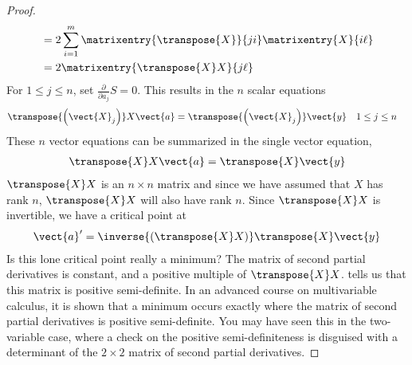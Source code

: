 \begin{proof}
\begin{align*}
%
&=2\sum_{i=1}^m\matrixentry{\transpose{X}}{ji}\matrixentry{X}{i\ell}\\
%
&=2\matrixentry{\transpose{X}X}{j\ell}
%
\end{align*}
%
For $1\leq j\leq n$, set $\frac{\partial}{\partial a_j}S=0$.  This results in the $n$ scalar equations 
%
\begin{align*}
\transpose{\left(\vect{X}_j\right)}X\vect{a}
&=\transpose{\left(\vect{X}_j\right)}\vect{y}
&
1\leq j\leq n&
\end{align*}
%
These $n$ vector equations can be summarized in the single vector equation,
%
\begin{align*}
\transpose{X}X\vect{a}=\transpose{X}\vect{y}
\end{align*}
%
$\transpose{X}X$ is an $n\times n$ matrix and since we have assumed that $X$ has rank $n$, $\transpose{X}X$ will also have rank $n$.  Since $\transpose{X}X$ is invertible, we have a critical point at
%
\begin{align*}
\vect{a}^\prime=\inverse{\left(\transpose{X}X\right)}\transpose{X}\vect{y}
\end{align*}
%
Is this lone critical point really a minimum?  The matrix of second partial derivatives is constant, and a positive multiple of $\transpose{X}X$.   tells us that this matrix is positive semi-definite.  In an advanced course on multivariable calculus, it is shown that a minimum occurs exactly where the matrix of second partial derivatives is positive semi-definite.  You may have seen this in the two-variable case, where a check on the positive semi-definiteness is disguised with a determinant of the $2\times 2$ matrix of second partial derivatives.
%
\end{proof}



%  
